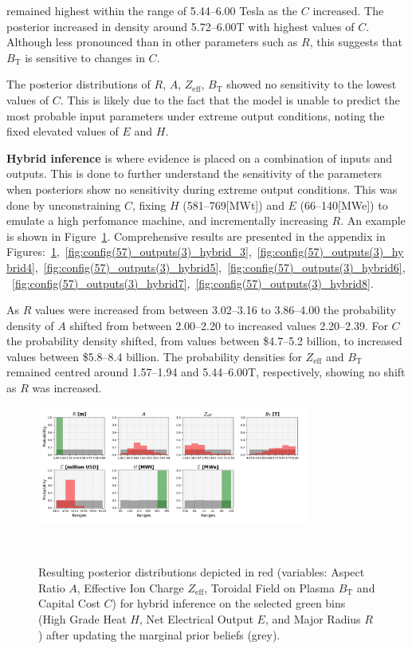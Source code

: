 \documentclass[journal]{IEEEtran}
\begin{document}
 remained highest within the range of 5.44--6.00 Tesla as the $C$ increased. The posterior increased in density around 5.72--6.00T with highest values of $C$. Although less pronounced than in other parameters such as $R$, this suggests that $B_{\text{T}}$ is sensitive to changes in $C$.

The posterior distributions of $R$, $A$, $Z_{\text{eff}}$, $B_{\text{T}}$ showed no sensitivity to the lowest values of $C$. This is likely due to the fact that the model is unable to predict the most probable input parameters under extreme output conditions, noting the fixed elevated values of $E$ and $H$. 

\textbf{Hybrid inference} is where evidence is placed on a combination of inputs and outputs. This is done to further understand the sensitivity of the parameters when posteriors show no sensitivity during extreme output conditions. This was done by unconstraining $C$, fixing $H$ (581--769[MWt]) and $E$ (66--140[MWe]) to emulate a high perfomance machine, and incrementally increasing $R$. An example is shown in Figure~\ref{fig:config(57)_outputs(3)_hybrid_2}. Comprehensive results are presented in the appendix in Figures:~\ref{fig:config(57)_outputs(3)_hybrid_2},~\ref{fig:config(57)_outputs(3)_hybrid_3},~\ref{fig:config(57)_outputs(3)_hybrid4},~\ref{fig:config(57)_outputs(3)_hybrid5},~\ref{fig:config(57)_outputs(3)_hybrid6},~\ref{fig:config(57)_outputs(3)_hybrid7},~\ref{fig:config(57)_outputs(3)_hybrid8}.

As $R$ values were increased from between 3.02--3.16 to 3.86--4.00 the probability density of $A$ shifted from between 2.00--2.20 to increased values 2.20--2.39. For $C$ the probability density shifted, from values between \$4.7--5.2 billion, to increased values between \$5.8--8.4 billion. The probability densities for $Z_{\text{eff}}$ and $B_{\text{T}}$ remained centred around 1.57--1.94 and 5.44--6.00T, respectively, showing no shift as $R$ was increased. 

\begin{figure}[t]
    \centering
    \includegraphics[width=0.80\textwidth]{figures/TE_results/march_data/config(57)_outputs(3)_hybrid_2.png}
    \caption{Resulting posterior distributions depicted in red (variables: Aspect Ratio $A$, Effective Ion Charge $Z_{\text{eff}}$, Toroidal Field on Plasma $B_{\text{T}}$ and Capital Cost $C$) for hybrid inference on the selected green bins (High Grade Heat $H$, Net Electrical Output $E$, and Major Radius $R$) after updating the marginal prior beliefs (grey).}~\label{fig:config(57)_outputs(3)_hybrid_2}
\end{figure}
\end{document}
